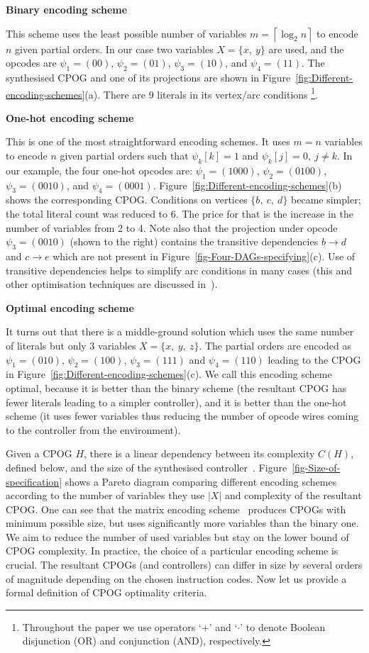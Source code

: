 \textbf{Binary encoding scheme}

This scheme uses the least possible number of variables $m=\left\lceil \log_{2}n\right\rceil $
to encode $n$ given partial orders. In our case two variables $X=\{x,\ y\}$
are used, and the opcodes are $\psi_{1}=(00)$, $\psi_{2}=(01)$,
$\psi_{3}=(10)$, and $\psi_{4}=(11)$. The synthesised CPOG and one
of its projections are shown in Figure~\ref{fig:Different-encoding-schemes}(a).
There are 9 literals in its vertex/arc conditions%
\footnote{Throughout the paper we use operators `$+$' and `$\cdot$' to
denote Boolean disjunction (OR) and conjunction (AND), respectively.%
}.

\textbf{One-hot encoding scheme}

This is one of the most straightforward encoding schemes. It uses
$m=n$ variables to encode $n$ given partial orders such that $\psi_{k}[k]=1$
and $\psi_{k}[j]=0,\ j\neq k$. In our example, the four one-hot opcodes
are: $\psi_{1}=(1000)$, $\psi_{2}=(0100)$, $\psi_{3}=(0010)$, and
$\psi_{4}=(0001)$. Figure~\ref{fig:Different-encoding-schemes}(b)
shows the corresponding CPOG. Conditions on vertices $\{b,\ c,\ d\}$
became simpler; the total literal count was reduced to $6$. The price
for that is the increase in the number of variables from 2 to 4. Note
also that the projection under opcode $\psi_{3}=(0010)$ (shown to
the right) contains the transitive dependencies $b\rightarrow d$
and $c\rightarrow e$ which are not present in Figure~\ref{fig-Four-DAGs-specifying}(c).
Use of transitive dependencies helps to simplify arc conditions in
many cases (this and other optimisation techniques are discussed in~\cite{2010_mokhov_ieee}).

\textbf{Optimal encoding scheme}

It turns out that there is a middle-ground solution which uses the
same number of literals but only $3$ variables $X=\{x,\ y,\ z\}$.
The partial orders are encoded as $\psi_{1}=(010)$, $\psi_{2}=(100)$,
$\psi_{3}=(111)$ and $\psi_{4}=(110)$ leading to the CPOG in Figure~\ref{fig:Different-encoding-schemes}(c).
We call this encoding scheme optimal, because it is better than the
binary scheme (the resultant CPOG has fewer literals leading to a
simpler controller), and it is better than the one-hot scheme (it
uses fewer variables thus reducing the number of opcode wires coming
to the controller from the environment).

Given a CPOG $H$, there is a linear dependency between its complexity
$C(H)$, defined below, and the size of the synthesised controller~\cite{2010_mokhov_ieee}.
Figure~\ref{fig-Size-of-specification} shows a Pareto diagram comparing
different encoding schemes according to the number of variables they
use $|X|$ and complexity of the resultant CPOG. One can see that
the matrix encoding scheme~\cite{2009_mokhov_phd} produces CPOGs
with minimum possible size, but uses significantly more variables
than the binary one. We aim to reduce the number of used variables
but stay on the lower bound of CPOG complexity. In practice, the choice
of a particular encoding scheme is crucial. The resultant CPOGs (and
controllers) can differ in size by several orders of magnitude depending
on the chosen instruction codes. Now let us provide a formal definition
of CPOG optimality criteria.

